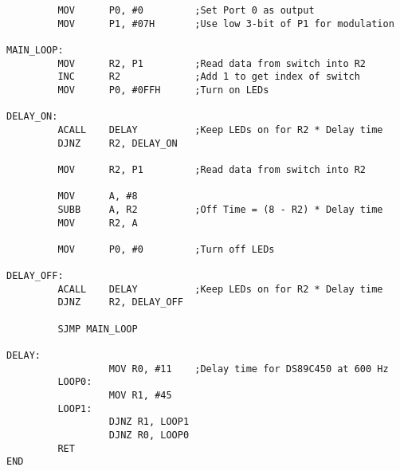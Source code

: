\documentclass[9pt]{article}
\begin{document}
\begin{enumerate}
\begin{verbatim}
         MOV      P0, #0         ;Set Port 0 as output
         MOV      P1, #07H       ;Use low 3-bit of P1 for modulation

MAIN_LOOP:
         MOV      R2, P1         ;Read data from switch into R2
         INC      R2             ;Add 1 to get index of switch
         MOV      P0, #0FFH      ;Turn on LEDs

DELAY_ON:
         ACALL    DELAY          ;Keep LEDs on for R2 * Delay time
         DJNZ     R2, DELAY_ON
				
         MOV      R2, P1         ;Read data from switch into R2
			
         MOV      A, #8					
         SUBB     A, R2          ;Off Time = (8 - R2) * Delay time
         MOV      R2, A	
         
         MOV      P0, #0         ;Turn off LEDs
	
DELAY_OFF:
         ACALL    DELAY          ;Keep LEDs on for R2 * Delay time
         DJNZ     R2, DELAY_OFF	
			
         SJMP MAIN_LOOP						

DELAY:
                  MOV R0, #11    ;Delay time for DS89C450 at 600 Hz
         LOOP0:
                  MOV R1, #45    
         LOOP1:
                  DJNZ R1, LOOP1 
                  DJNZ R0, LOOP0
         RET
END
         \end{verbatim}
\end{enumerate}
\end{document}
